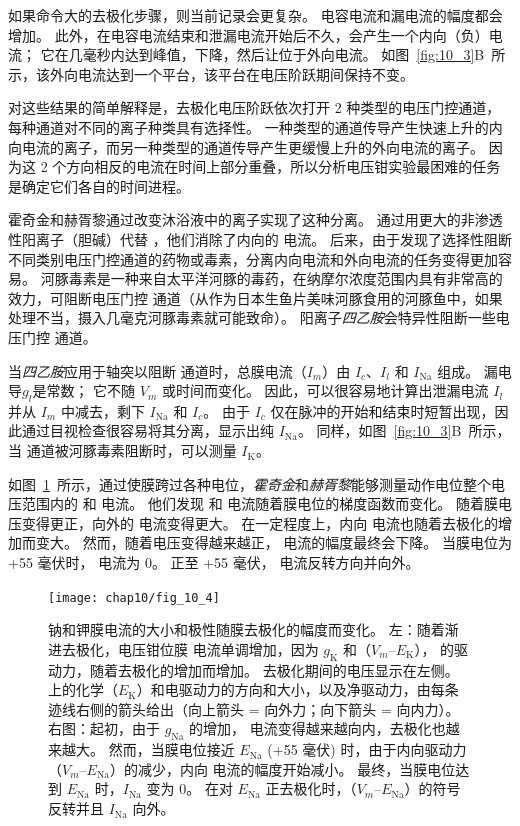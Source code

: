 如果命令大的去极化步骤，则当前记录会更复杂。
电容电流和漏电流的幅度都会增加。
此外，在电容电流结束和泄漏电流开始后不久，会产生一个内向（负）电流；
它在几毫秒内达到峰值，下降，然后让位于外向电流。
如图~\ref{fig:10_3}B~所示，该外向电流达到一个平台，该平台在电压阶跃期间保持不变。


对这些结果的简单解释是，去极化电压阶跃依次打开 2 种类型的电压门控通道，每种通道对不同的离子种类具有选择性。
一种类型的通道传导产生快速上升的内向电流的离子，而另一种类型的通道传导产生更缓慢上升的外向电流的离子。
因为这 2 个方向相反的电流在时间上部分重叠，所以分析电压钳实验最困难的任务是确定它们各自的时间进程。


霍奇金和赫胥黎通过改变沐浴液中的离子实现了这种分离。
通过用更大的非渗透性阳离子（胆碱）代替 ，他们消除了内向的  电流。
后来，由于发现了选择性阻断不同类别电压门控通道的药物或毒素，分离内向电流和外向电流的任务变得更加容易。
河豚毒素是一种来自太平洋河豚的毒药，在纳摩尔浓度范围内具有非常高的效力，可阻断电压门控  通道（从作为日本生鱼片美味河豚食用的河豚鱼中，如果处理不当，摄入几毫克河豚毒素就可能致命）。
阳离子\textit{四乙胺}会特异性阻断一些电压门控  通道。


当\textit{四乙胺}应用于轴突以阻断  通道时，总膜电流（$I_m$）由 $I_c$、$I_l$ 和 $I_\text{Na}$ 组成。
漏电导$g_l$是常数；
它不随 $V_m$ 或时间而变化。
因此，可以很容易地计算出泄漏电流 $I_l$ 并从 $I_m$ 中减去，剩下 $I_\text{Na}$ 和 $I_c$。
由于 $I_c$ 仅在脉冲的开始和结束时短暂出现，因此通过目视检查很容易将其分离，显示出纯 $I_\text{Na}$。
同样，如图~\ref{fig:10_3}B~所示，当  通道被河豚毒素阻断时，可以测量 $I_\text{K}$。


如图~\ref{fig:10_4}~所示，通过使膜跨过各种电位，\textit{霍奇金}和\textit{赫胥黎}能够测量动作电位整个电压范围内的  和  电流。
他们发现  和  电流随着膜电位的梯度函数而变化。
随着膜电压变得更正，向外的  电流变得更大。
在一定程度上，内向  电流也随着去极化的增加而变大。
然而，随着电压变得越来越正， 电流的幅度最终会下降。
当膜电位为 +55 毫伏时， 电流为 0。
正至 +55 毫伏， 电流反转方向并向外。


\begin{figure}[htbp]
	\centering
	\texttt{[image: chap10/fig\_10\_4]}
	\caption{钠和钾膜电流的大小和极性随膜去极化的幅度而变化。
		左：随着渐进去极化，电压钳位膜  电流单调增加，因为 $g_\text{K}$ 和（$V_m – E_\text{K}$）， 的驱动力，随着去极化的增加而增加。
		去极化期间的电压显示在左侧。
		 上的化学（$E_\text{K}$）和电驱动力的方向和大小，以及净驱动力，由每条迹线右侧的箭头给出（向上箭头 = 向外力；向下箭头 = 向内力）。
		右图：起初，由于 $g_\text{Na}$ 的增加， 电流变得越来越向内，去极化也越来越大。
		然而，当膜电位接近 $E_{\text{Na}}$ (+55 毫伏) 时，由于内向驱动力（$V_m – E_{\text{Na}}$）的减少，内向  电流的幅度开始减小。
		最终，当膜电位达到 $E_{\text{Na}}$ 时，$I_\text{Na}$ 变为 0。
		在对 $E_{\text{Na}}$ 正去极化时，（$V_m – E_{\text{Na}}$）的符号反转并且 $I_\text{Na}$ 向外。}
	\label{fig:10_4}
\end{figure}


